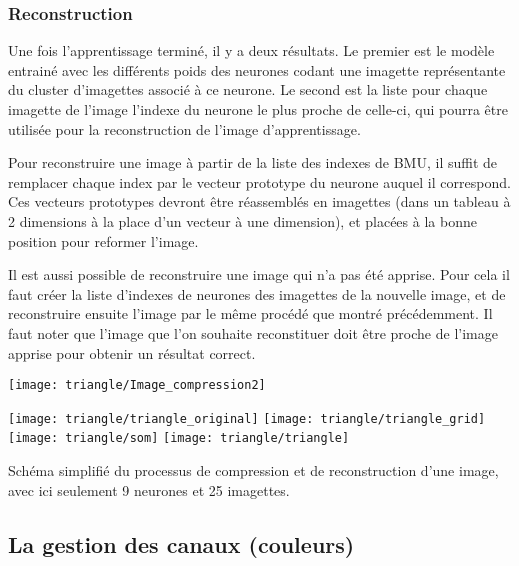 	\subsubsection{Reconstruction}

	Une fois l'apprentissage terminé, il y a deux résultats. Le premier est le modèle entrainé avec les différents poids des neurones codant une imagette représentante du cluster d'imagettes associé à ce neurone. Le second est la liste pour chaque imagette de l'image l'indexe du neurone le plus proche de celle-ci, qui pourra être utilisée pour la reconstruction de l'image d'apprentissage.  

	Pour reconstruire une image à partir de la liste des indexes de BMU, il suffit de remplacer chaque index par le vecteur prototype du neurone auquel il correspond. Ces vecteurs prototypes devront être réassemblés en imagettes (dans un tableau à 2 dimensions à la place d'un vecteur à une dimension), et placées à la bonne position pour reformer l'image.

	Il est aussi possible de reconstruire une image qui n'a pas été apprise. Pour cela il faut créer la liste d'indexes de neurones des imagettes de la nouvelle image, et de reconstruire ensuite l'image par le même procédé que montré précédemment. Il faut noter que l'image que l'on souhaite reconstituer doit être proche de l'image apprise pour obtenir un résultat correct.

	\begin{figureth}
		\begin{subfigureth}{\textwidth}
			\texttt{[image: triangle/Image\_compression2]}
		\end{subfigureth}
		\begin{subfigureth}{\textwidth}
			\texttt{[image: triangle/triangle\_original]}\hfill
			\texttt{[image: triangle/triangle\_grid]}\hfill
			\texttt{[image: triangle/som]}\hfill
			\texttt{[image: triangle/triangle]}
		\end{subfigureth}
		\caption[Compression et décompression d'image]{Schéma simplifié du processus de compression et de reconstruction d'une image, avec ici seulement 9 neurones et 25 imagettes.}\label{fig:img:comp_ex}
	\end{figureth}

	\subsection{La gestion des canaux (couleurs)}\label{sec:img:colors}

